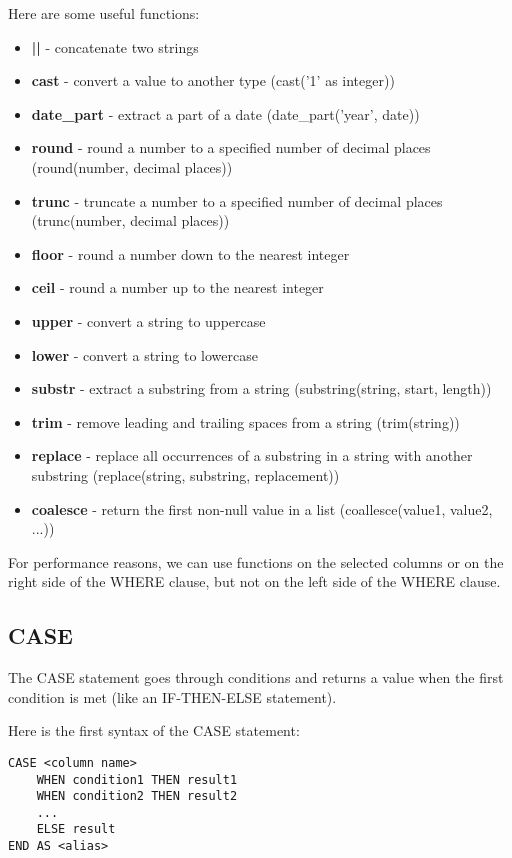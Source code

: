 \documentclass[a4paper,12pt]{article}
\begin{document}
Here are some useful functions:
\begin{itemize}
	\item \textbf{||} - concatenate two strings
	\item \textbf{cast} - convert a value to another type (cast('1' as integer))
	\item \textbf{date\_part} - extract a part of a date (date\_part('year', date))
	\item \textbf{round} - round a number to a specified number of decimal places (round(number, decimal places))
	\item \textbf{trunc} - truncate a number to a specified number of decimal places (trunc(number, decimal places))
	\item \textbf{floor} - round a number down to the nearest integer
	\item \textbf{ceil} - round a number up to the nearest integer
	\item \textbf{upper} - convert a string to uppercase
	\item \textbf{lower} - convert a string to lowercase
	\item \textbf{substr} - extract a substring from a string (substring(string, start, length))
	\item \textbf{trim} - remove leading and trailing spaces from a string (trim(string))
	\item \textbf{replace} - replace all occurrences of a substring in a string with another substring (replace(string, substring, replacement))
	\item \textbf{coalesce} - return the first non-null value in a list (coallesce(value1, value2, ...))
\end{itemize}

For performance reasons, we can use functions on the selected columns or on the right side of the WHERE clause, but not on the left side of the WHERE clause.

\subsection{CASE}

The CASE statement goes through conditions and returns a value when the first condition is met (like an IF-THEN-ELSE statement).

Here is the first syntax of the CASE statement:
\begin{verbatim}
CASE <column name>
	WHEN condition1 THEN result1
	WHEN condition2 THEN result2
	...
	ELSE result
END AS <alias>
\end{verbatim}
\end{document}
